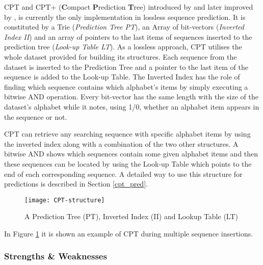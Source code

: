 CPT and CPT+ (\textbf{C}ompact \textbf{P}rediction \textbf{T}ree) introduced by \citeauthor{gueniche_fournier-viger_tseng_2013} \citeyear{gueniche_fournier-viger_tseng_2013} and later improved by \citeauthor{gueniche_fournier-viger_raman_tseng_2015} \citeyear{gueniche_fournier-viger_raman_tseng_2015}, is currently the only implementation in lossless sequence prediction. It is constituted by a Trie (\emph{Prediction Tree PT}), an Array of bit-vectors (\emph{Inverted Index II}) and an array of pointers to the last items of sequences inserted to the prediction tree (\emph{Look-up Table LT}). As a lossless approach, CPT utilises the whole dataset provided for building its structures. Each sequence from the dataset is inserted to the Prediction Tree and a pointer to the last item of the sequence is added to the Look-up Table. The Inverted Index has the role of finding which sequence contains which alphabet's items by simply executing a bitwise AND operation. Every bit-vector has the same length with the size of the dataset's alphabet while it notes, using 1/0, whether an alphabet item appears in the sequence or not.
\par CPT can retrieve any searching sequence with specific alphabet items by using the inverted index along with a combination of the two other structures. A bitwise AND shows which sequences contain some given alphabet items and then these sequences can be located by using the Look-up Table which points to the end of each corresponding sequence. A detailed way to use this structure for predictions is described in Section \ref{cpt_pred}.

\begin{figure}[h]
    \centering
    \texttt{[image: CPT-structure]}
    \caption{A Prediction Tree (PT), Inverted Index (II) and Lookup Table (LT)}
    \label{fig:CPT-structure}
\end{figure}

In Figure \ref{fig:CPT-structure} it is shown an example of CPT during multiple sequence insertions.


\subsubsection{Strengths \& Weaknesses}

